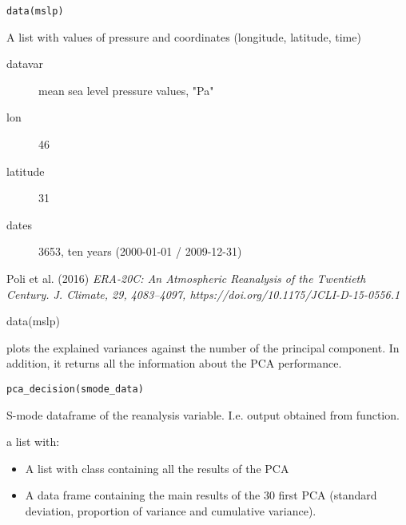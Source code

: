 \documentclass[a4paper]{book}
\begin{document}
%
\begin{Usage}
\begin{verbatim}
data(mslp)
\end{verbatim}
\end{Usage}
%
\begin{Format}
A list with values of pressure and coordinates (longitude, latitude, time)
\begin{description}

\item[datavar] mean sea level pressure values, "Pa"
\item[lon] 46
\item[latitude] 31
\item[dates] 3653, ten years (2000-01-01 / 2009-12-31)

\end{description}
\end{Format}
%
\begin{References}\relax
Poli et al. (2016)
\emph{ERA-20C: An Atmospheric Reanalysis of the Twentieth Century.
J. Climate, 29, 4083–4097, https://doi.org/10.1175/JCLI-D-15-0556.1}
\end{References}
%
\begin{Examples}
\begin{ExampleCode}
data(mslp)
\end{ExampleCode}
\end{Examples}
%
\begin{Description}\relax
{} plots the explained variances against the number of the principal component. In addition, it returns all the information about the PCA performance.
\end{Description}
%
\begin{Usage}
\begin{verbatim}
pca_decision(smode_data)
\end{verbatim}
\end{Usage}
%
\begin{Arguments}
\begin{ldescription}
\item[\code{smode\_data}] S-mode dataframe of the reanalysis variable. I.e. output obtained from  function.
\end{ldescription}
\end{Arguments}
%
\begin{Value}
a list with: \begin{itemize}

\item A list with class  containing all the results of the PCA 
\item A data frame containing the main results of the 30 first PCA (standard deviation, proportion of variance and cumulative variance).

\end{itemize}

\end{Value}
\end{document}
